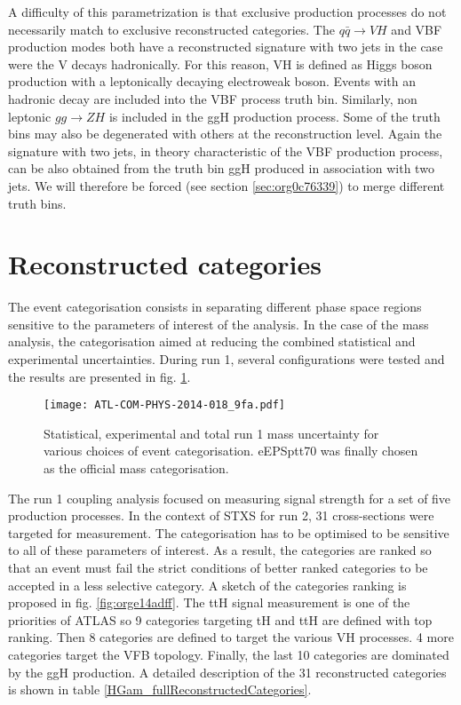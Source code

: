 A difficulty of this parametrization is that exclusive production processes do not necessarily match to exclusive reconstructed categories.
The \(q\bar{q}\rightarrow VH\) and VBF production modes both have a reconstructed signature with two jets in the case were the V decays hadronically.
For this reason, VH is defined as Higgs boson production with a leptonically decaying electroweak boson.
Events with an hadronic decay are included into the VBF process truth bin.
Similarly, non leptonic \(gg\rightarrow ZH\) is included in the ggH production process.
Some of the truth bins may also be degenerated with others at the reconstruction level.
Again the signature with two jets, in theory characteristic of the VBF production process, can be also obtained from the truth bin ggH produced in association with two jets.
We will therefore be forced (see section \ref{sec:org0c76339}) to merge different truth bins.


\section{Reconstructed categories}
\label{sec:orgdbf5aa8}
\label{HGam_RecCateg}
The event categorisation consists in separating different phase space regions sensitive to the parameters of interest of the analysis.
In the case of the mass analysis, the categorisation aimed at reducing the combined statistical and experimental uncertainties.
During run 1, several configurations were tested and the results are presented in fig. \ref{fig:org9ced173}.

\begin{figure}[htbp]
\centering
\texttt{[image: ATL-COM-PHYS-2014-018\_9fa.pdf]}
\caption{\label{fig:org9ced173}
  Statistical, experimental and total run 1 mass uncertainty for various choices of event categorisation.
  eEPSptt70 was finally chosen as the official mass categorisation.
  \cite{ATL-COM-PHYS-2014-018}}
\end{figure}


The run 1 coupling analysis focused on measuring signal strength for a set of five production processes.
In the context of STXS for run 2, 31 cross-sections were targeted for measurement.
The categorisation has to be optimised to be sensitive to all of these parameters of interest.
As a result, the categories are ranked so that an event must fail the strict conditions of better ranked categories to be accepted in a less selective category.
A sketch of the categories ranking is proposed in fig. \ref{fig:orge14adff}.
The ttH signal measurement is one of the priorities of ATLAS so 9 categories targeting tH and ttH are defined with top ranking.
Then 8 categories are defined to target the various VH processes.
4 more categories target the VFB topology.
Finally, the last 10 categories are dominated by the ggH production.
A detailed description of the 31 reconstructed categories is shown in table \ref{HGam_fullReconstructedCategories}.

